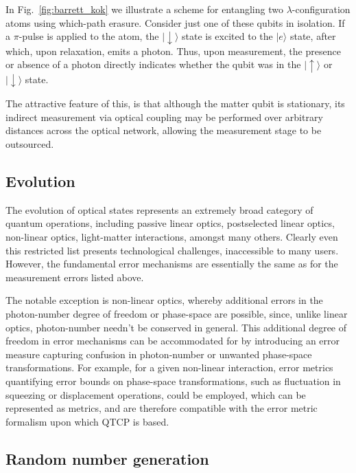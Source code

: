 \documentclass[aps,rmp,twocolumn,amsmath,amssymb,nofootinbib,superscriptaddress,longbibliography,floatfix]{revtex4-1}
\newcommand{\ket}[1]{|#1\rangle}
\begin{document}
In Fig.~\ref{fig:barrett_kok} we illustrate a scheme for entangling two $\lambda$-configuration atoms using which-path erasure. Consider just one of these qubits in isolation. If a $\pi$-pulse is applied to the atom, the $\ket{\downarrow}$ state is excited to the $\ket{e}$ state, after which, upon relaxation, emits a photon. Thus, upon measurement, the presence or absence of a photon directly indicates whether the qubit was in the $\ket\uparrow$ or $\ket\downarrow$ state.

The attractive feature of this, is that although the matter qubit is stationary, its indirect measurement via optical coupling may be performed over arbitrary distances across the optical network, allowing the measurement stage to be outsourced.

%
%

\subsection{Evolution}

The evolution of optical states represents an extremely broad category of quantum operations, including passive linear optics, postselected linear optics, non-linear optics, light-matter interactions, amongst many others. Clearly even this restricted list presents technological challenges, inaccessible to many users. However, the fundamental error mechanisms are essentially the same as for the measurement errors listed above.

The notable exception is non-linear optics, whereby additional errors in the photon-number degree of freedom or phase-space are possible, since, unlike linear optics, photon-number needn't be conserved in general. This additional degree of freedom in error mechanisms can be accommodated for by introducing an error measure capturing confusion in photon-number or unwanted phase-space transformations. For example, for a given non-linear interaction, error metrics quantifying error bounds on phase-space transformations, such as fluctuation in squeezing or displacement operations, could be employed, which can be represented as metrics, and are therefore compatible with the error metric formalism upon which QTCP is based.

%
%

\subsection{Random number generation}
\end{document}
